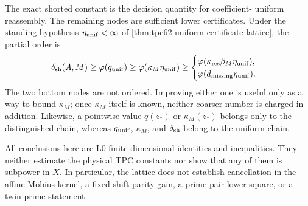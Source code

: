 The exact shorted constant is the decision quantity for coefficient-
uniform reassembly.  The remaining nodes are sufficient lower
certificates.  Under the standing hypothesis
\(\eta_{\rm unif}<\infty\) of
\cref{thm:tpc62-uniform-certificate-lattice}, the partial order is
\begin{equation}
 \delta_{\rm sh}(A,M)
 \ge\varphi(q_{\rm unif})
 \ge\varphi(\kappa_M\eta_{\rm unif})
 \ge
 \begin{cases}
  \varphi(\kappa_{\rm res}\beta_M\eta_{\rm unif}),\\
  \varphi(d_{\rm missing}\eta_{\rm unif}).
 \end{cases}
 \label{eq:tpc62-certificate-poset-display}
\end{equation}
The two bottom nodes are not ordered.  Improving either one is useful only
as a way to bound \(\kappa_M\); once \(\kappa_M\) itself is known, neither
coarser number is charged in addition.  Likewise, a pointwise value
\(q(z_*)\) or \(\kappa_M(z_*)\) belongs only to the distinguished chain,
whereas \(q_{\rm unif}\), \(\kappa_M\), and
\(\delta_{\rm sh}\) belong to the uniform chain.

All conclusions here are L0 finite-dimensional identities and
inequalities.  They neither estimate the physical TPC constants nor show
that any of them is subpower in \(X\).  In particular, the lattice does
not establish cancellation in the affine M\"obius kernel, a fixed-shift
parity gain, a prime-pair lower square, or a twin-prime statement.
